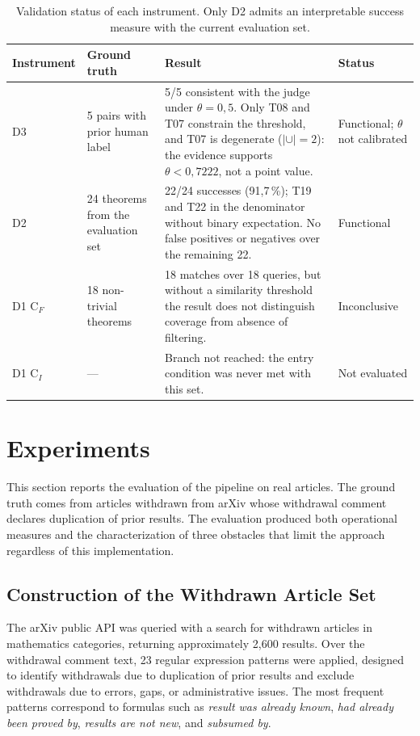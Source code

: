 \documentclass[12pt,a4paper]{article}
\theoremstyle{remark}
\begin{document}
\begin{table}[htbp]
\centering
\small
\setlength{\tabcolsep}{4pt}
\renewcommand{\arraystretch}{1.15}
\begin{tabular}{p{1.9cm}p{2.6cm}p{6.4cm}p{3.4cm}}
\toprule
Instrument & Ground truth & Result & Status \\
\midrule
D3 &
5 pairs with prior human label &
5/5 consistent with the judge under $\theta = 0{,}5$. Only T08 and T07 constrain the threshold, and T07 is degenerate ($|\cup| = 2$): the evidence supports $\theta < 0{,}7222$, not a point value. &
Functional; $\theta$ not calibrated \\
\addlinespace
D2 &
24 theorems from the evaluation set &
22/24 successes (91{,}7\,\%); T19 and T22 in the denominator without binary expectation. No false positives or negatives over the remaining 22. &
Functional \\
\addlinespace
D1 C$_F$ &
18 non-trivial theorems &
18 matches over 18 queries, but without a similarity threshold the result does not distinguish coverage from absence of filtering. &
Inconclusive \\
\addlinespace
D1 C$_I$ &
--- &
Branch not reached: the entry condition was never met with this set. &
Not evaluated \\
\bottomrule
\end{tabular}
\caption{Validation status of each instrument. Only D2 admits an interpretable success measure with the current evaluation set.}
\label{tab:instrumentos}
\end{table}


\section{Experiments}

\label{sec:experimentos}

This section reports the evaluation of the pipeline on real articles. The ground truth comes from articles withdrawn from arXiv whose withdrawal comment declares duplication of prior results. The evaluation produced both operational measures and the characterization of three obstacles that limit the approach regardless of this implementation.

\subsection{Construction of the Withdrawn Article Set}

The arXiv public API was queried with a search for withdrawn articles in mathematics categories, returning approximately 2,600 results. Over the withdrawal comment text, 23 regular expression patterns were applied, designed to identify withdrawals due to duplication of prior results and exclude withdrawals due to errors, gaps, or administrative issues. The most frequent patterns correspond to formulas such as \textit{result was already known}, \textit{had already been proved by}, \textit{results are not new}, and \textit{subsumed by}.
\end{document}
